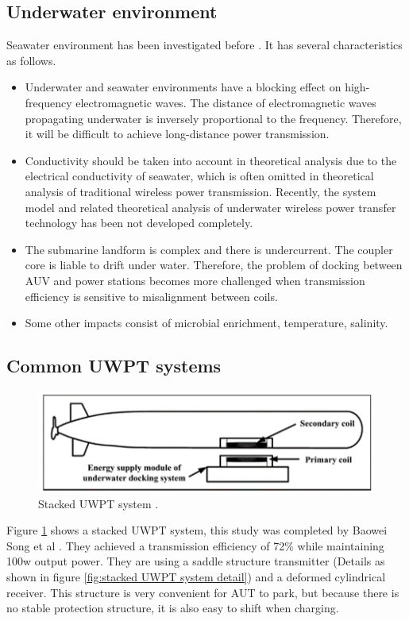 \subsection{Underwater environment}
Seawater environment has been investigated before \cite{Shaw2006, Orekan, Taormina2018}. It has several characteristics as follows.
\begin{itemize}
    \item Underwater and seawater environments have a blocking effect on high-frequency electromagnetic waves. 
    The distance of electromagnetic waves propagating underwater is inversely proportional to the frequency.
    Therefore, it will be difficult to achieve long-distance power transmission.
    \item Conductivity should be taken into account in theoretical analysis due to the electrical conductivity of seawater, which is often omitted in theoretical analysis of traditional wireless power transmission. 
    Recently, the system model and related theoretical analysis of underwater wireless power transfer technology has been not developed completely.
    \item The submarine landform is complex and there is undercurrent. 
    The coupler core is liable to drift under water.
    Therefore, the problem of docking between AUV and power stations becomes more challenged when transmission efficiency is sensitive to misalignment between coils.
    \item Some other impacts consist of microbial enrichment, temperature, salinity.
\end{itemize}

\subsection{Common UWPT systems}

\begin{figure}[!b]
    \centering
    \includegraphics[width=0.7\linewidth]{images/1_stacked_UWPT_system.png}
    \caption{Stacked UWPT system \cite{Song}.}
    \label{fig:stacked UWPT system}
\end{figure}
Figure \ref{fig:stacked UWPT system} shows a stacked UWPT system, this study was completed by Baowei Song et al \cite{Song}. They achieved a transmission efficiency of 72\% while maintaining 100w output power.
They are using a saddle structure transmitter (Details as shown in figure \ref{fig:stacked UWPT system detail}) and a deformed cylindrical receiver. This structure is very convenient for AUT to park, but because there is no stable protection structure, it is also easy to shift when charging.

